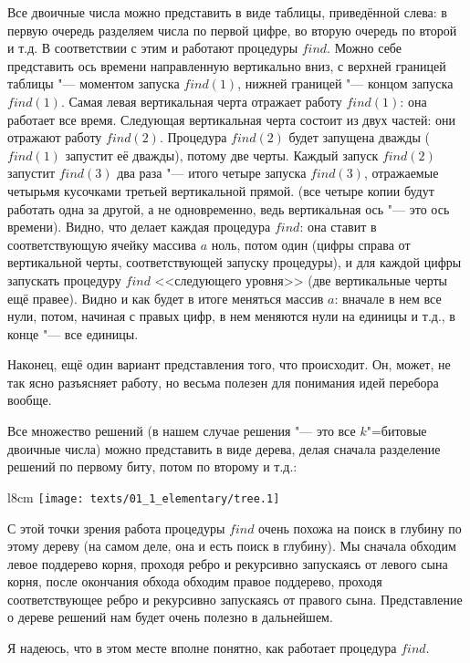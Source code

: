 Все двоичные числа можно представить в виде таблицы, приведённой слева:
в первую очередь разделяем числа по первой цифре, во вторую очередь по второй и 
т.д. В соответствии с этим и работают процедуры $find$. Можно себе представить 
ось времени направленную вертикально вниз, с верхней границей таблицы "--- моментом 
запуска $find(1)$, нижней границей "--- концом запуска $find(1)$. Самая левая 
вертикальная черта отражает работу $find(1)$: она работает все время. Следующая 
вертикальная черта состоит из двух частей: они отражают работу $find(2)$. 
Процедура $find(2)$ будет запущена дважды ($find(1)$ запустит её дважды), потому 
две черты. Каждый запуск $find(2)$ запустит $find(3)$ два раза "--- итого четыре 
запуска $find(3)$, отражаемые четырьмя кусочками третьей вертикальной прямой. 
(все четыре копии будут работать одна за другой, а не одновременно, ведь 
вертикальная ось "--- это ось времени). Видно, что делает каждая процедура $find$: 
она ставит в соответствующую ячейку массива $a$ ноль, потом один (цифры справа от 
вертикальной черты, соответствующей запуску процедуры), и для каждой цифры 
запускать процедуру $find$ <<следующего уровня>> (две вертикальные черты ещё 
правее). Видно и как будет в итоге меняться массив $a$: вначале в нем все нули, 
потом, начиная с правых цифр, в нем меняются нули на единицы и т.д., в конце 
"--- все единицы.

Наконец, ещё один вариант представления того, что происходит. Он, может, не так 
ясно разъясняет работу, но весьма полезен для понимания идей перебора вообще.

Все множество решений (в нашем случае решения "--- это все $k$"=битовые двоичные 
числа) можно представить в виде дерева, делая сначала разделение решений по 
первому биту, потом по второму и т.д.:

\begin{wrapfigure}{l}{8cm}
\texttt{[image: texts/01\_1\_elementary/tree.1]}
\end{wrapfigure}

С этой точки зрения работа процедуры $find$ очень похожа на поиск в глубину по этому 
дереву (на самом деле, она и есть поиск в глубину). Мы сначала обходим левое 
поддерево корня, проходя ребро и рекурсивно запускаясь от левого сына корня, 
после окончания обхода обходим правое поддерево, проходя соответствующее ребро 
и рекурсивно запускаясь от правого сына. Представление о дереве решений нам 
будет очень полезно в дальнейшем.

Я надеюсь, что в этом месте вполне понятно, как работает процедура $find$.

